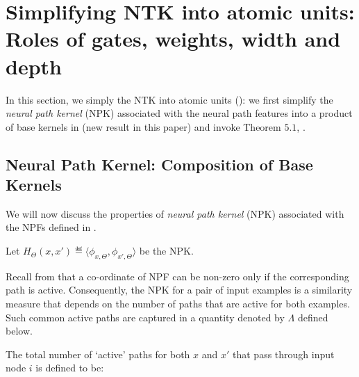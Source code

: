 \section{Simplifying NTK into atomic units: Roles of gates, weights, width and depth}
In this section, we simply the NTK into atomic units (): we first simplify the \emph{neural path kernel} (NPK) associated with the neural path features into a product of base kernels in  (new result in this paper) and invoke {Theorem $5.1$}, \cite{npk}. 
\subsection{Neural Path Kernel: Composition of Base Kernels}
We will now discuss the properties of \emph{neural path kernel} (NPK) associated with the NPFs defined in .  
\begin{definition}
Let $H_{\Theta}(x,x')\eqdef\langle\phi_{x,\Theta},\phi_{x',\Theta} \rangle$ be the NPK.
\end{definition}

Recall from  that a co-ordinate of NPF can be non-zero only if the corresponding path is active. Consequently, the NPK for a pair of input examples is a similarity measure that depends on the number of paths that are active for both examples. Such common active paths are captured in a quantity denoted by $\Lambda$ defined below.
\begin{definition}\label{def:cnnlambda}
The total number of `active' paths for both $x$ and $x'$ that pass through input node $i$ is defined to be:
\end{definition}
